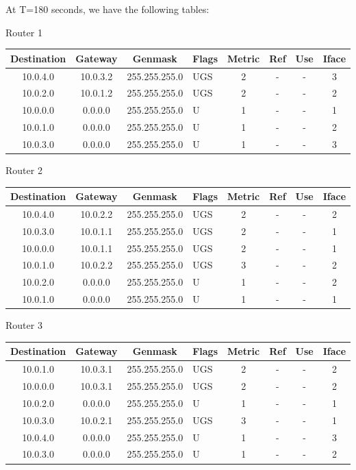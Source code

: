 \documentclass[12pt]{article}
\begin{document}
\begin{enumerate}[label=(\alph*)]
    At T=180 seconds, we have the following tables:
    \begin{center}
        Router 1

        \begin{tabular}{|c|c|c|l|c|c|c|c|}
            \hline
            Destination & Gateway & Genmask & Flags & Metric & Ref & Use & Iface \\
            \hline
            10.0.4.0 & 10.0.3.2 & 255.255.255.0 & UGS & 2 & - & - & 3 \\
            10.0.2.0 & 10.0.1.2 & 255.255.255.0 & UGS & 2 & - & - & 2 \\
            10.0.0.0 & 0.0.0.0 & 255.255.255.0 & U & 1 & - & - & 1 \\
            10.0.1.0 & 0.0.0.0 & 255.255.255.0 & U & 1 & - & - & 2 \\
            10.0.3.0 & 0.0.0.0 & 255.255.255.0 & U & 1 & - & - & 3 \\
            \hline
        \end{tabular}

        Router 2

        \begin{tabular}{|c|c|c|l|c|c|c|c|}
            \hline
            Destination & Gateway & Genmask & Flags & Metric & Ref & Use & Iface \\
            \hline
            10.0.4.0 & 10.0.2.2 & 255.255.255.0 & UGS & 2 & - & - & 2 \\
            10.0.3.0 & 10.0.1.1 & 255.255.255.0 & UGS & 2 & - & - & 1 \\
            10.0.0.0 & 10.0.1.1 & 255.255.255.0 & UGS & 2 & - & - & 1 \\
            10.0.1.0 & 10.0.2.2 & 255.255.255.0 & UGS & 3 & - & - & 2 \\
            10.0.2.0 & 0.0.0.0 & 255.255.255.0 & U & 1 & - & - & 2 \\
            10.0.1.0 & 0.0.0.0 & 255.255.255.0 & U & 1 & - & - & 1 \\
            \hline
        \end{tabular}

        Router 3

        \begin{tabular}{|c|c|c|l|c|c|c|c|}
            \hline
            Destination & Gateway & Genmask & Flags & Metric & Ref & Use & Iface \\
            \hline
            10.0.1.0 & 10.0.3.1 & 255.255.255.0 & UGS & 2 & - & - & 2 \\
            10.0.0.0 & 10.0.3.1 & 255.255.255.0 & UGS & 2 & - & - & 2 \\
            10.0.2.0 & 0.0.0.0 & 255.255.255.0 & U & 1 & - & - & 1 \\
            10.0.3.0 & 10.0.2.1 & 255.255.255.0 & UGS & 3 & - & - & 1 \\
            10.0.4.0 & 0.0.0.0 & 255.255.255.0 & U & 1 & - & - & 3 \\
            10.0.3.0 & 0.0.0.0 & 255.255.255.0 & U & 1 & - & - & 2 \\
            \hline
        \end{tabular}      
    \end{center}


\end{enumerate}
\end{document}
